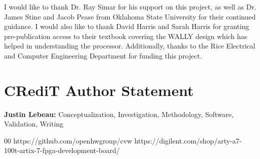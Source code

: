 \documentclass[conference]{IEEEtran}
\begin{document}
I would like to thank Dr. Ray Simar for his support on this project, as well as Dr. James Stine and Jacob Pease from Oklahoma State University for their continued guidance. I would also like to thank David Harris and Sarah Harris for granting pre-publication access to their textbook covering the WALLY design which has helped in understanding the processor. Additionally, thanks to the Rice Electrical and Computer Engineering Department for funding this project.

\section*{CRediT Author Statement}
\textbf{Justin Lebeau:}
Conceptualization, Investigation, Methodology, Software, Validation, Writing

\begin{thebibliography}{00}
 https://github.com/openhwgroup/cvw
 https://digilent.com/shop/arty-a7-100t-artix-7-fpga-development-board/

\end{thebibliography}
\end{document}
